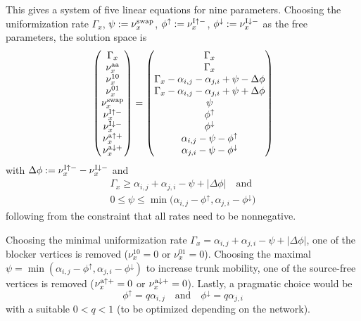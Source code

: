 \documentclass[english,10pt,aps,pra,twocolumn,superscriptaddress,floatfix,fleqn]{revtex4-2}
\newcommand{\tI}{\textnormal{I}}
\newcommand{\ta}{\textnormal{a}}
\newcommand{\taa}{\textnormal{aa}}
\newcommand{\swap}{\textnormal{swap}}
\let\up\uparrow
\let\dw\downarrow
\newcommand  {\Pmatrix}[1]{\begin{pmatrix}#1\end{pmatrix}}
\begin{document}
This gives a system of five linear equations for nine parameters. Choosing the uniformization rate $\Gamma_x$, $\psi:=\nu^\swap_x$, $\phi^\up:=\nu^{\tI\up-}_x$, $\phi^\dw:=\nu^{\tI\dw-}_x$ as the free parameters, the solution space is
\begin{equation}\label{eq:SIS-E3-sol}
	\Pmatrix{\Gamma_x\\ \nu^\taa_x \\ \nu^{10}_x \\ \nu^{01}_x \\ \nu^\swap_x \\ \nu^{\tI\up-}_x \\ \nu^{\tI\dw-}_x \\ \nu^{\ta\up+}_x \\ \nu^{\ta\dw+}_x}
	= \Pmatrix{\Gamma_x\\ \Gamma_x \\ \Gamma_x - \alpha_{i,j} - \alpha_{j,i} + \psi - \Delta\phi \\ \Gamma_x - \alpha_{i,j} - \alpha_{j,i} + \psi + \Delta\phi \\ \psi \\ \phi^\up \\ \phi^\dw \\ \alpha_{i,j} - \psi - \phi^\up \\ \alpha_{j,i} - \psi - \phi^\dw}
\end{equation}
with $\Delta\phi:=\nu^{\tI\up-}_x-\nu^{\tI\dw-}_x$ and
\begin{subequations}\label{eq:SIS-E3-solRange}
\begin{gather}
	\Gamma_x \geq \alpha_{i,j} + \alpha_{j,i} - \psi + |\Delta\phi|\quad\text{and}\\
	0 \leq \psi \leq \min\big(\alpha_{i,j} - \phi^\up, \alpha_{j,i} - \phi^\dw\big)
\end{gather}
\end{subequations}
following from the constraint that all rates need to be nonnegative.

Choosing the minimal uniformization rate $\Gamma_x=\alpha_{i,j} + \alpha_{j,i} - \psi + |\Delta\phi|$, one of the blocker vertices is removed ($\nu^{10}_x=0$ or $\nu^{01}_x=0$). Choosing the maximal $\psi=\min(\alpha_{i,j} - \phi^\up, \alpha_{j,i} - \phi^\dw)$ to increase trunk mobility, one of the source-free vertices is removed ($\nu^{\ta\up+}_x=0$ or $\nu^{\ta\dw+}_x=0$). Lastly, a pragmatic choice would be
\begin{equation}
	\phi^\up=q\alpha_{i,j}\quad\text{and}\quad
	\phi^\dw=q\alpha_{j,i}
\end{equation}
with a suitable $0<q<1$ (to be optimized depending on the network).
\end{document}

